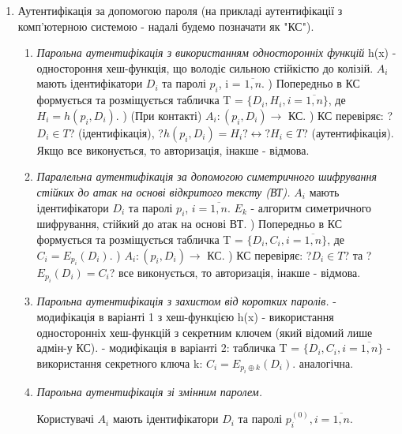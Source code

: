\begin{enumerate}
\item Аутентифікація за допомогою пароля  (на прикладі аутентифікації з комп'ютерною системою - надалі будемо позначати як "КС").
 \begin{enumerate}
    \item \textit{Парольна аутентифікація з використанням односторонніх функцій}
     h(x) - одностороння хеш-функція, що володіє сильною стійкістю до колізій.
     $A_{i}$ мають ідентифікатори $D_{i}$ та паролі $p_{i}$, i = $\overline{1,n}$.
        ) Попередньо в КС формується та розміщується табличка \newline T = $\{D_{i}, H_{i}, i = \overline{1,n}\}$, де $H_{i} = h(p_{i},D_{i})$.
        ) (При контакті) $A_{i}: (p_{i},D_{i}) \rightarrow $ КС.
        ) КС перевіряє: ?$D_{i} \in T$? (ідентифікація),
        \newline ?$h(p_{i}, D_{i}) = H_{i}? \longleftrightarrow ?H_{i} \in T$? (аутентифікація).
        \newline Якщо все виконується, то авторизація, інакше - відмова.  
    \item \textit{Паралельна аутентифікація за допомогою симетричного шифрування стійких до атак на основі відкритого тексту (ВТ).}
      $A_{i}$ мають ідентифікатори $D_{i}$ та паролі $p_{i}$, $i = \overline{1,n}$.
      $E_{k}$ - алгоритм симетричного шифрування, стійкий до атак на основі ВТ.
     ) Попередньо в КС формується та розміщується табличка 
     \newline T = $\{D_{i}, C_{i}, i = \overline{1,n}\}$, де $C_{i} = E_{p_{i}}(D_{i})$.
     ) $A_{i}: (p_{i},D_{i}) \rightarrow $ КС.
     ) КС перевіряє: ?$D_{i} \in T$? та ?$E_{p_{i}}(D_{i}) = C_{i}$?
      все виконується, то авторизація, інакше - відмова.
    \item \textit{Парольна аутентифікація з захистом від коротких паролів.}
     \newline- модифікація в варіанті 1 з хеш-функцією h(x) - використання односторонніх хеш-функцій з секретним ключем (який відомий лише адмін-у КС).
     \newline- модифікація в варіанті 2: табличка T = $\{D_{i}, C_{i}, i = \overline{1,n}\}$ - використання секретного ключа k: $C_{i} = E_{p_{i}\oplus k}(D_{i})$.
      аналогічна.
    \item \textit{Парольна аутентифікація зі змінним паролем.}
    \par Користувачі $A_{i}$ мають ідентифікатори $D_{i}$ та паролі $p_{i}^{(0)}, i = \overline{1,n}$.

\end{enumerate}
\end{enumerate}
